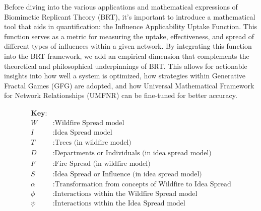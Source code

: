 \documentclass[sn-nature]{sn-jnl}%
\theoremstyle{thmstyleone}%
\theoremstyle{thmstyletwo}%
\theoremstyle{thmstylethree}%
\begin{document}
Before diving into the various applications and mathematical expressions of Biomimetic Replicant Theory (BRT), it's important to introduce a mathematical tool that aids in quantification: the Influence Applicability Uptake Function. This function serves as a metric for measuring the uptake, effectiveness, and spread of different types of influences within a given network. By integrating this function into the BRT framework, we add an empirical dimension that complements the theoretical and philosophical underpinnings of BRT. This allows for actionable insights into how well a system is optimized, how strategies within Generative Fractal Games (GFG) are adopted, and how Universal Mathematical Framework for Network Relationships (UMFNR) can be fine-tuned for better accuracy.
\begin{figure}[h!]
\begin{minipage}{0.3\textwidth}
\end{minipage}
\begin{minipage}{0.5\textwidth}
\begin{align*}
\boxed{
\begin{aligned}
\textbf{Key:} \\
W & : \text{Wildfire Spread model} \\
I & : \text{Idea Spread model} \\
T & : \text{Trees (in wildfire model)} \\
D & : \text{Departments or Individuals (in idea spread model)} \\
F & : \text{Fire Spread (in wildfire model)} \\
S & : \text{Idea Spread or Influence (in idea spread model)} \\
\alpha & : \text{Transformation from concepts of Wildfire to Idea Spread} \\
\phi & : \text{Interactions within the Wildfire Spread model} \\
\psi & : \text{Interactions within the Idea Spread model}
\end{aligned}
}
\end{align*}


\end{minipage}
\end{figure}
\end{document}
